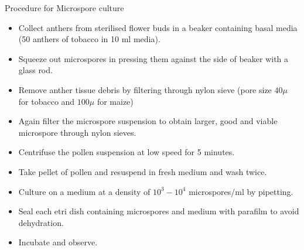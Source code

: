 \documentclass[
  ignorenonframetext,
  aspectratio=169]{beamer}
\providecommand{\tightlist}{%
  \setlength{\itemsep}{0pt}\setlength{\parskip}{0pt}}
\begin{document}
\begin{frame}{Procedure for Microspore culture}
\protect\hypertarget{procedure-for-microspore-culture}{}
\begin{itemize}
\tightlist
\item
  Collect anthers from sterilised flower buds in a beaker containing
  basal media (50 anthers of tobacco in 10 ml media).
\item
  Squeeze out microspores in pressing them against the side of beaker
  with a glass rod.
\item
  Remove anther tissue debris by filtering through nylon sieve (pore
  size \(40\mu\) for tobacco and \(100\mu\) for maize)
\item
  Again filter the microspore suspension to obtain larger, good and
  viable microspore through nylon sieves.
\item
  Centrifuse the pollen suspension at low speed for 5 minutes.
\item
  Take pellet of pollen and resuspend in fresh medium and wash twice.
\item
  Culture on a medium at a density of \(10^3-10^4\) microspores/ml by
  pipetting.
\item
  Seal each etri dish containing microspores and medium with parafilm to
  avoid dehydration.
\item
  Incubate and observe.
\end{itemize}
\end{frame}
\end{document}
